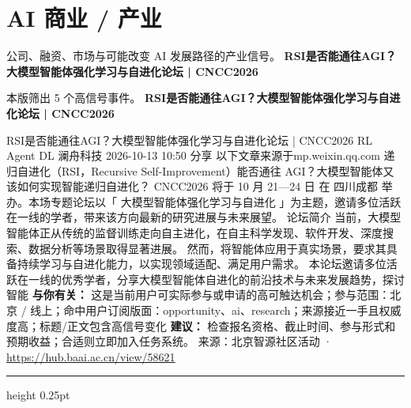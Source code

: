 \documentclass[10.5pt]{ctexart}
\begin{document}
\section*{AI 商业 / 产业}
{\color{ormuted} 公司、融资、市场与可能改变 AI 发展路径的产业信号。}
\vspace{2mm}
{\LARGE\bfseries RSI是否能通往AGI？大模型智能体强化学习与自进化论坛 | CNCC2026}\par
\vspace{1mm}
{\color{ormuted} 本版筛出 5 个高信号事件。}
\vspace{3mm}
{\Large\bfseries RSI是否能通往AGI？大模型智能体强化学习与自进化论坛 | CNCC2026}\par
RSI是否能通往AGI？大模型智能体强化学习与自进化论坛 | CNCC2026 RL Agent DL 澜舟科技 2026-10-13 10:50 分享 以下文章来源于mp.weixin.qq.com 递归自进化（RSI，Recursive Self-Improvement）能否通往 AGI？大模型智能体又该如何实现智能递归自进化？ CNCC2026 将于 10 月 21—24 日 在 四川成都 举办。本场专题论坛以「 大模型智能体强化学习与自进化 」为主题，邀请多位活跃在一线的学者，带来该方向最新的研究进展与未来展望。 论坛简介 当前，大模型智能体正从传统的监督训练走向自主进化，在自主科学发现、软件开发、深度搜索、数据分析等场景取得显著进展。 然而，将智能体应用于真实场景，要求其具备持续学习与自进化能力，以实现领域适配、满足用户需求。 本论坛邀请多位活跃在一线的优秀学者，分享大模型智能体自进化的前沿技术与未来发展趋势，探讨智能
\textbf{与你有关：} 这是当前用户可实际参与或申请的高可触达机会；参与范围：北京 / 线上；命中用户订阅版面：opportunity、ai、research；来源接近一手且权威度高；标题/正文包含高信号变化
\textbf{建议：} 检查报名资格、截止时间、参与形式和预期收益；合适则立即加入任务系统。
{\footnotesize\color{ormuted} 来源：北京智源社区活动 · \url{https://hub.baai.ac.cn/view/58621}}
\vspace{4mm}
\hrule height 0.25pt
\vspace{3mm}
\end{document}
